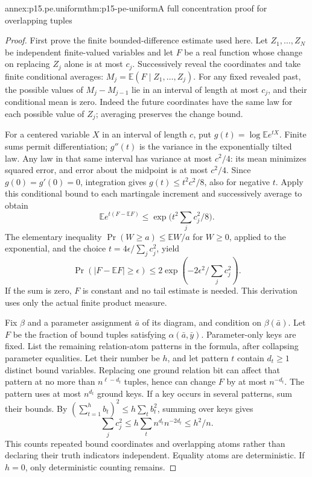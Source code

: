 \begin{annexitem}{annex:p15.pe.uniform}{thm:p15-pe-uniform}{A full concentration proof for overlapping tuples}
\begin{proof}
First prove the finite bounded-difference estimate used here.
Let \(Z_1,\ldots,Z_N\) be independent finite-valued variables and let
\(F\) be a real function whose change on replacing \(Z_j\) alone is
at most \(c_j\). Successively reveal the coordinates and take finite
conditional averages: \(M_j=\mathbb E(F\mid Z_1,\ldots,Z_j)\).
For any fixed revealed past, the possible values of \(M_j-M_{j-1}\)
lie in an interval of length at most \(c_j\), and their conditional
mean is zero. Indeed the future coordinates have the same law for
each possible value of \(Z_j\); averaging preserves the change bound.

For a centered variable \(X\) in an interval of length \(c\), put
\(g(t)=\log\mathbb E e^{tX}\). Finite sums permit differentiation;
\(g''(t)\) is the variance in the exponentially tilted law.
Any law in that same interval has variance at most \(c^2/4\):
its mean minimizes squared error, and error about the midpoint is
at most \(c^2/4\). Since \(g(0)=g'(0)=0\), integration gives
\(g(t)\le t^2c^2/8\), also for negative \(t\).
Apply this conditional bound to each martingale increment and
successively average to obtain
\[
 \mathbb E e^{t(F-\mathbb EF)}
          \le \exp\bigl(t^2\textstyle\sum_jc_j^2/8\bigr).
\]
The elementary inequality
\(\Pr(W\ge a)\le\mathbb EW/a\) for \(W\ge0\), applied to the
exponential, and the choice
\(t=4\epsilon/\sum_jc_j^2\), yield
\[
 \Pr(|F-\mathbb EF|\ge\epsilon)
       \le 2\exp(-2\epsilon^2/\textstyle\sum_jc_j^2).
\]
If the sum is zero, \(F\) is constant and no tail estimate is needed.
This derivation uses only the actual finite product measure.

Fix \(\beta\) and a parameter assignment \(\bar a\) of its diagram,
and condition on \(\beta(\bar a)\). Let \(F\) be the fraction of
bound tuples satisfying \(\alpha(\bar a,\bar y)\).
Parameter-only keys are fixed. List the remaining relation-atom
patterns in the formula, after collapsing parameter equalities.
Let their number be \(h\), and let pattern \(t\) contain \(d_t\ge1\)
distinct bound variables. Replacing one ground relation bit can
affect that pattern at no more than \(n^{\ell-d_t}\) tuples, hence
can change \(F\) by at most \(n^{-d_t}\).
The pattern uses at most \(n^{d_t}\) ground keys.
If a key occurs in several patterns, sum their bounds. By
\((\sum_{t=1}^{h}b_t)^2\le h\sum_tb_t^2\), summing over keys gives
\[
 \sum_jc_j^2
   \le h\sum_t n^{d_t}n^{-2d_t}\le h^2/n.
\]
This counts repeated bound coordinates and overlapping atoms rather
than declaring their truth indicators independent. Equality atoms
are deterministic. If \(h=0\), only deterministic counting remains.


\end{proof}
\end{annexitem}
